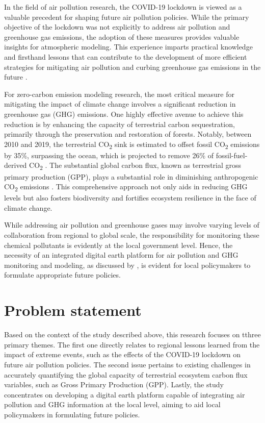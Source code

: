 In the field of air pollution research, the COVID-19 lockdown is viewed as a valuable precedent for shaping future air pollution policies. While the primary objective of the lockdown was not explicitly to address air pollution and greenhouse gas emissions, the adoption of these measures provides valuable insights for atmospheric modeling. This experience imparts practical knowledge and firsthand lessons that can contribute to the development of more efficient strategies for mitigating air pollution and curbing greenhouse gas emissions in the future \citep{grange2021covid}. \par

For zero-carbon emission modeling research, the most critical measure for mitigating the impact of climate change involves a significant reduction in greenhouse gas (GHG) emissions. One highly effective avenue to achieve this reduction is by enhancing the capacity of terrestrial carbon sequestration, primarily through the preservation and restoration of forests. Notably, between 2010 and 2019, the terrestrial CO\textsubscript{2} sink is estimated to offset fossil CO\textsubscript{2} emissions by 35\%, surpassing the ocean, which is projected to remove 26\% of fossil-fuel-derived CO\textsubscript{2} \citep{friedlingstein2020global, wang2022disentangling}. The substantial global carbon flux, known as terrestrial gross primary production (GPP), plays a substantial role in diminishing anthropogenic CO\textsubscript{2} emissions \citep{beer2010terrestrial}. This comprehensive approach not only aids in reducing GHG levels but also fosters biodiversity and fortifies ecosystem resilience in the face of climate change. \par

While addressing air pollution and greenhouse gases may involve varying levels of collaboration from regional to global scale, the responsibility for monitoring these chemical pollutants is evidently at the local government level. Hence, the necessity of an integrated digital earth platform for air pollution and GHG monitoring and modeling, as discussed by \citep{fukui2021digital}, is evident for local policymakers to formulate appropriate future policies. \par

\section{Problem statement}
Based on the context of the study described above, this research focuses on tthree primary themes. The first one directly relates to regional lessons learned from the impact of extreme events, such as the effects of the COVID-19 lockdown on future air pollution policies. The second issue pertains to existing challenges in accurately quantifying the global capacity of terrestrial ecosystem carbon flux variables, such as Gross Primary Production (GPP). Lastly, the study concentrates on developing a digital earth platform capable of integrating air pollution and GHG information at the local level, aiming to aid local policymakers in formulating future policies. \par


